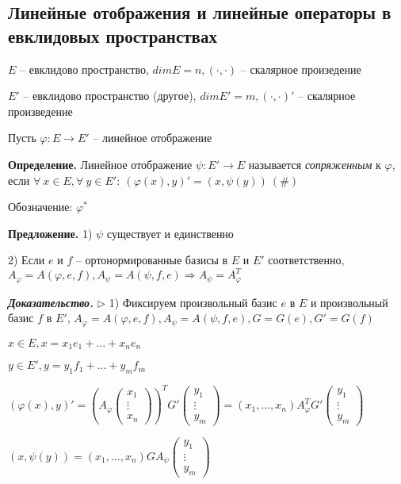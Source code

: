 \subsection{Линейные отображения и линейные операторы в евклидовых пространствах}

$E$ -- евклидово пространство, $dim E = n, ( \cdot, \cdot)$ -- скалярное произедение

$E'$ -- евклидово пространство (другое), $dim E' = m, (\cdot, \cdot)'$ -- скалярное произведение

Пусть $\varphi: E \rightarrow E'$ -- линейное отображение

\textbf{Определение.} Линейное отображение $\psi: E' \rightarrow E$ называется \textit{сопряженным} к $\varphi$, если $\forall \ x \in E, \forall \ y \in E': \ (\varphi(x), y)' = (x, \psi(y)) \ (\#)$

Обозначение: $\varphi^*$

\bigskip
\textbf{Предложение.} 1) $\psi$ существует и единственно

2) Если $e$ и $f$ -- ортонормированные базисы в $E$ и $E'$ соответственно, $A_{\varphi} = A(\varphi, e, f), A_{\psi} = A(\psi, f, e) \Rightarrow A_{\psi} = A_{\varphi}^T$

\bigskip
\textbf{\textit{Доказательство.}} $\rhd$ 1) Фиксируем произвольный базис $e$ в $E$ и произвольный базис $f$ в $E'$, $A_{\varphi} = A(\varphi, e, f), A_{\psi} = A(\psi, f, e), G = G(e), G' = G(f)$

$x \in E, x = x_1 e_1 + \dots + x_n e_n$

$y \in E', y = y_1 f_1 + \dots + y_m f_m$

$(\varphi(x), y)' = \left(A_{\varphi} \begin{pmatrix} x_1 \\ \vdots \\ x_n \end{pmatrix} \right)^T G' \begin{pmatrix} y_1 \\ \vdots \\ y_m \end{pmatrix} = (x_1, \dots, x_n) A_{\varphi}^T G' \begin{pmatrix} y_1 \\ \vdots \\ y_m \end{pmatrix}$

$(x, \psi(y)) = (x_1, \dots, x_n) G A_{\psi} \begin{pmatrix} y_1 \\ \vdots \\ y_m \end{pmatrix}$

